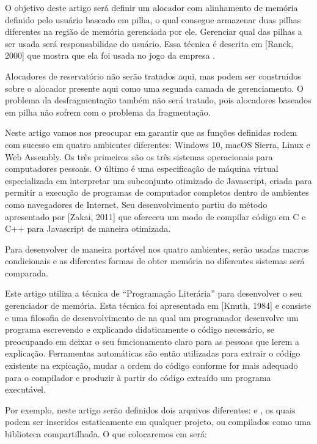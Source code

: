 O objetivo deste artigo será definir um alocador com alinhamento de
memória definido pelo usuário baseado em pilha, o qual consegue
armazenar duas pilhas diferentes na região de memória gerenciada por
ele. Gerenciar qual das pilhas a ser usada será responsabilidae do
usuário. Essa técnica é descrita em [Ranck, 2000] que mostra que ela
foi usada no jogo  da empresa .

Alocadores de reservatório não serão tratados aqui, mas podem ser
construídos sobre o alocador presente aqui como uma segunda camada de
gerenciamento. O problema da desfragmentação também não será tratado,
pois alocadores baseados em pilha não sofrem com o problema da
fragmentação.


Neste artigo vamos nos preocupar em garantir que as funções definidas
rodem com sucesso em quatro ambientes diferentes: Windows 10, macOS
Sierra, Linux e Web Assembly. Os três primeiros são os três sistemas
operacionais para computadores pessoais. O último é uma especificação
de máquina virtual especializada em interpretar um subconjunto
otimizado de Javascript, criada para permitir a execução de programas
de computador completos dentro de ambientes como navegadores de
Internet. Seu desenvolvimento partiu do método apresentado por [Zakai,
2011] que ofereceu um modo de compilar código em C e C++ para
Javascript de maneira otimizada.

Para desenvolver de maneira portável nos quatro ambientes, serão
usadas macros condicionais e as diferentes formas de obter memória no
diferentes sistemas será comparada.


Este artigo utiliza a técnica de ``Programação Literária'' para
desenvolver o seu gerenciador de memória. Esta técnica foi apresentada
em [Knuth, 1984] e consiste e uma filosofia de desenvolvimento de
 na qual um programador desenvolve um programa escrevendo
e explicando didaticamente o código necessário, se preocupando em
deixar o seu funcionamento claro para as pessoas que lerem a
explicação. Ferramentas automáticas são então utilizadas para extrair
o código existente na expicação, mudar a ordem do código conforme for
mais adequado para o compilador e produzir à partir do código extraído
um programa executável.

Por exemplo, neste artigo serão definidos dois arquivos
diferentes:  e , os quais
podem ser inseridos estaticamente em qualquer projeto, ou compilados
como uma biblioteca compartilhada. O que colocaremos
em  será:

